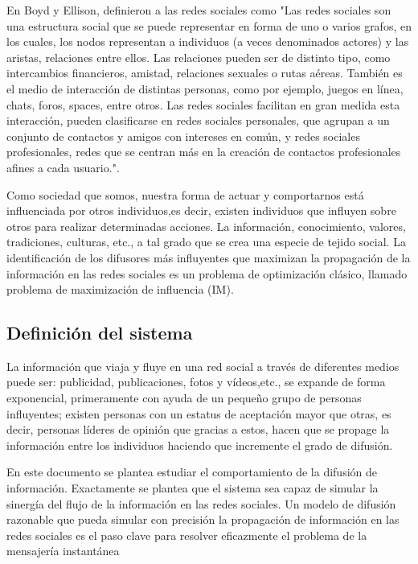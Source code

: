 \documentclass{article}
\begin{document}
 En Boyd y Ellison, definieron a las redes sociales como "Las redes sociales son una estructura social que se puede representar en forma de uno o varios grafos, en los cuales, los nodos representan a individuos (a veces denominados actores) y las aristas, relaciones entre ellos. Las relaciones pueden ser de distinto tipo, como intercambios financieros, amistad, relaciones sexuales o rutas aéreas. También es el medio de interacción de distintas personas, como por ejemplo, juegos en línea, chats, foros, spaces, entre otros. Las redes sociales facilitan en gran medida esta interacción, pueden clasificarse en redes sociales personales, que agrupan a un conjunto de contactos y amigos con intereses en común, y redes sociales profesionales, redes que se centran más en la creación de contactos profesionales afines a cada usuario."\cite{definition:redsocial}. 
 
 Como sociedad que somos, nuestra forma de actuar y comportarnos está influenciada por otros individuos,es decir, existen individuos que influyen sobre otros para realizar determinadas acciones. La información, conocimiento, valores, tradiciones, culturas, etc., a tal grado que se crea una especie de tejido social. La identificación de los difusores más influyentes que maximizan la propagación de la información en las redes sociales es un problema de optimización clásico, llamado problema de maximización de influencia (IM).
   
 \subsection{Definición del sistema}
La información que viaja y fluye en una red social a través de diferentes medios puede ser: publicidad, publicaciones, fotos y vídeos,etc., se expande de forma exponencial, primeramente con ayuda
de un pequeño grupo de personas influyentes; existen personas con un estatus de aceptación mayor que otras, es decir, personas líderes de opinión que gracias a estos, hacen que se propage la información entre los individuos haciendo que incremente el grado de difusión.

En este documento se plantea estudiar el comportamiento de la difusión de información. Exactamente se plantea que el sistema sea capaz de simular la sinergía del flujo de la información en las redes sociales. Un modelo de difusión razonable que pueda simular con precisión la propagación de información en las redes sociales es el paso clave para resolver eficazmente el problema de la
mensajería instantánea
 
\end{document}
